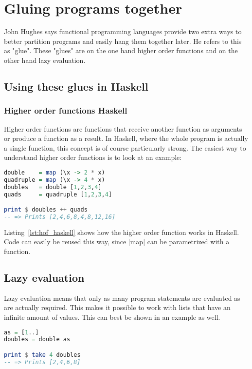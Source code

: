 \section{Gluing programs together}
John Hughes says functional programming languages provide two extra ways to
better partition programs and easily hang them together later. He refers to
this as "glue". These "glues" are on the one hand higher order functions and on
the other hand lazy evaluation. \cite{hughes_why_1989}

\subsection{Using these glues in Haskell} %
\label{sub:Using the glues in Haskel}
\subsubsection{Higher order functions Haskell} %
\label{sec:Higher order functions Haskell}
Higher order functions are functions that receive another function as arguments
or produce a function as a result. In Haskell, where the whole program is
actually a single function, this concept is of course particularly strong.
The easiest way to understand higher order functions is to look at an
example:
\begin{lstlisting}[language=Haskell, caption=Higher order functions in
HaskellHigher order functions in Haskell \label{lst:hof_haskell}]
double    = map (\x -> 2 * x)
quadruple = map (\x -> 4 * x)
doubles   = double [1,2,3,4]
quads     = quadruple [1,2,3,4]

print $ doubles ++ quads
-- => Prints [2,4,6,8,4,8,12,16]
\end{lstlisting}

Listing~\ref{lst:hof_haskell} shows how the higher order function 
works in Haskell. Code can easily be reused this way, since |map| can
be parametrized with a function.
\subsection{Lazy evaluation} %
\label{sub:Lazy evaluation}
Lazy evaluation means that only as many program statements are evaluated as are
actually required. This makes it possible to work with lists that have an
infinite amount of values. This can best be shown in an example as well.

\begin{lstlisting}[language=Haskell, caption=lazy evaluation in Haskell
  \label{lst:lazy_eval_haskell}]
as = [1..]
doubles = double as

print $ take 4 doubles 
-- => Prints [2,4,6,8]
\end{lstlisting}

